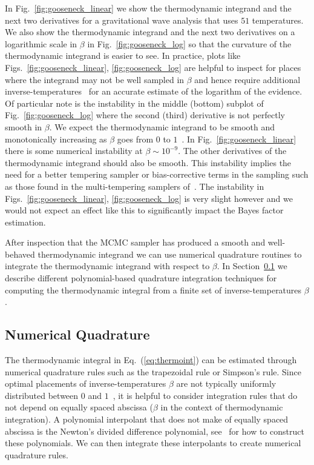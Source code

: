 In Fig.~\ref{fig:gooseneck_linear} we show the thermodynamic integrand and the next two derivatives for a gravitational wave analysis that uses $51$ temperatures. We also show the thermodynamic integrand and the next two derivatives on a logarithmic scale in $\beta$ in Fig.~\ref{fig:gooseneck_log} so that the curvature of the thermodynamic integrand is easier to see. In practice, plots like Figs.~\ref{fig:gooseneck_linear}, \ref{fig:gooseneck_log} are helpful to inspect for places where the integrand may not be well sampled in $\beta$ and hence require additional inverse-temperatures~\cite{liu2016evaluating, de2011free, de2013comparison} for an accurate estimate of the logarithm of the evidence. Of particular note is the instability in the middle (bottom) subplot of Fig.~\ref{fig:gooseneck_log} where the second (third) derivative is not perfectly smooth in $\beta$. We expect the thermodynamic integrand to be smooth and monotonically increasing as $\beta$ goes from $0$ to $1$~\cite{annis2019thermodynamic}. In Fig.~\ref{fig:gooseneck_linear} there is some numerical instability at $\beta \sim 10^{-9}$. The other derivatives of the thermodynamic integrand should also be smooth. This instability implies the need for a better tempering sampler or bias-corrective terms in the sampling such as those found in the multi-tempering samplers of~\cite{oates2017control,evans2019thermodynamic}. The instability in Figs.~\ref{fig:gooseneck_linear}, \ref{fig:gooseneck_log} is very slight however and we would not expect an effect like this to significantly impact the Bayes factor estimation.

After inspection that the MCMC sampler has produced a smooth and well-behaved thermodynamic integrand we can use numerical quadrature routines to integrate the thermodynamic integrand with respect to $\beta$. In Section~\ref{sec:ti_num_quad} we describe different polynomial-based quadrature integration techniques for computing the thermodynamic integral from a finite set of inverse-temperatures $\beta$.

\subsection{Numerical Quadrature}\label{sec:ti_num_quad}
The thermodynamic integral in Eq.~(\ref{eq:thermoint}) can be estimated through numerical quadrature rules such as the trapezoidal rule or Simpson's rule. Since optimal placements of inverse-temperatures $\beta$ are not typically uniformly distributed between $0$ and $1$~\cite{annis2019thermodynamic}, it is helpful to consider integration rules that do not depend on equally spaced abscissa ($\beta$ in the context of thermodynamic integration). A polynomial interpolant that does not make of equally spaced abscissa is the Newton's divided difference polynomial, see~\cite{brun1953generalization, selmer1958numerical, abramowitz1965handbook} for how to construct these polynomials. We can then integrate these interpolants to create numerical quadrature rules.

